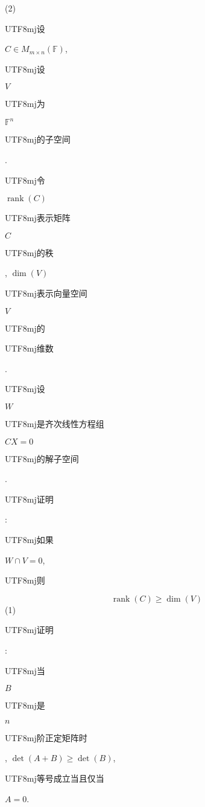 \documentclass[10pt]{article}
\begin{document}
(2) \begin{CJK}{UTF8}{mj}设\end{CJK} $C \in M_{m \times n}(\mathbb{F})$, \begin{CJK}{UTF8}{mj}设\end{CJK} $V$ \begin{CJK}{UTF8}{mj}为\end{CJK} $\mathbb{F}^{n}$ \begin{CJK}{UTF8}{mj}的子空间\end{CJK}. \begin{CJK}{UTF8}{mj}令\end{CJK} $\operatorname{rank}(C)$ \begin{CJK}{UTF8}{mj}表示矩阵\end{CJK} $C$ \begin{CJK}{UTF8}{mj}的秩\end{CJK}, $\operatorname{dim}(V)$ \begin{CJK}{UTF8}{mj}表示向量空间\end{CJK} $V$ \begin{CJK}{UTF8}{mj}的\end{CJK} \begin{CJK}{UTF8}{mj}维数\end{CJK}. \begin{CJK}{UTF8}{mj}设\end{CJK} $W$ \begin{CJK}{UTF8}{mj}是齐次线性方程组\end{CJK} $C X=0$ \begin{CJK}{UTF8}{mj}的解子空间\end{CJK}. \begin{CJK}{UTF8}{mj}证明\end{CJK}: \begin{CJK}{UTF8}{mj}如果\end{CJK} $W \cap V=0$, \begin{CJK}{UTF8}{mj}则\end{CJK}
$$
\operatorname{rank}(C) \geqslant \operatorname{dim}(V)
$$
(1) \begin{CJK}{UTF8}{mj}证明\end{CJK}: \begin{CJK}{UTF8}{mj}当\end{CJK} $B$ \begin{CJK}{UTF8}{mj}是\end{CJK} $n$ \begin{CJK}{UTF8}{mj}阶正定矩阵时\end{CJK}, $\operatorname{det}(A+B) \geqslant \operatorname{det}(B)$, \begin{CJK}{UTF8}{mj}等号成立当且仅当\end{CJK} $A=0$.
\end{document}
